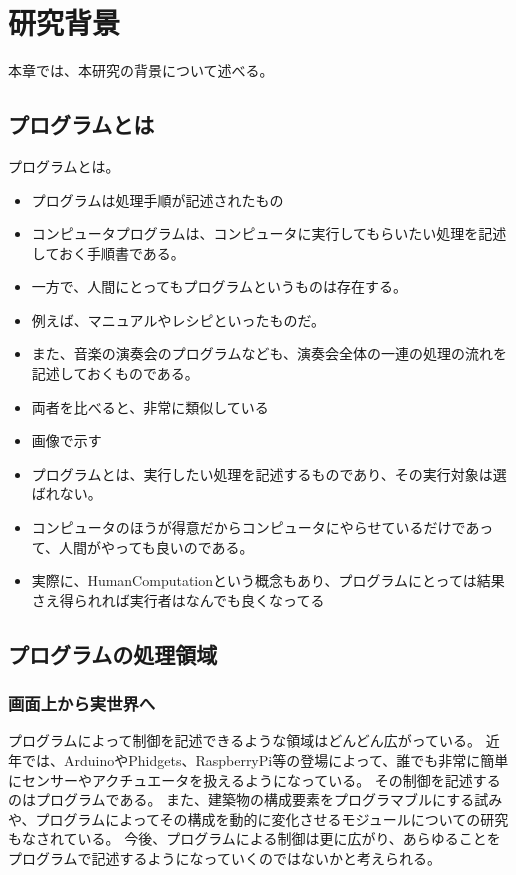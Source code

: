 \chapter{研究背景}\label{chap:background}

本章では、本研究の背景について述べる。

\section{プログラムとは}\label{ux30d7ux30edux30b0ux30e9ux30e0ux3068ux306f}

プログラムとは。

\begin{itemize}
\itemsep1pt\parskip0pt
\item
  プログラムは処理手順が記述されたもの
\item
  コンピュータプログラムは、コンピュータに実行してもらいたい処理を記述しておく手順書である。
\item
  一方で、人間にとってもプログラムというものは存在する。
\item
  例えば、マニュアルやレシピといったものだ。
\item
  また、音楽の演奏会のプログラムなども、演奏会全体の一連の処理の流れを記述しておくものである。
\item
  両者を比べると、非常に類似している
\item
  画像で示す
\item
  プログラムとは、実行したい処理を記述するものであり、その実行対象は選ばれない。
\item
  コンピュータのほうが得意だからコンピュータにやらせているだけであって、人間がやっても良いのである。
\item
  実際に、HumanComputationという概念もあり、プログラムにとっては結果さえ得られれば実行者はなんでも良くなってる
\end{itemize}

\section{プログラムの処理領域}\label{ux30d7ux30edux30b0ux30e9ux30e0ux306eux51e6ux7406ux9818ux57df}

\subsection{画面上から実世界へ}\label{ux753bux9762ux4e0aux304bux3089ux5b9fux4e16ux754cux3078}

プログラムによって制御を記述できるような領域はどんどん広がっている。
近年では、ArduinoやPhidgets、RaspberryPi等の登場によって、誰でも非常に簡単にセンサーやアクチュエータを扱えるようになっている。
その制御を記述するのはプログラムである。
また、建築物の構成要素をプログラマブルにする試みや、プログラムによってその構成を動的に変化させるモジュールについての研究もなされている。
今後、プログラムによる制御は更に広がり、あらゆることをプログラムで記述するようになっていくのではないかと考えられる。


